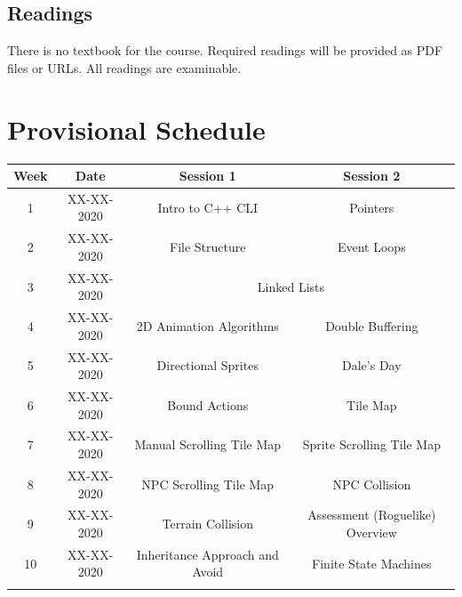 \documentclass{article}
\begin{document}
\subsection*{Readings}
There is no textbook for the course. Required readings will be provided as PDF files or URLs. All readings are examinable.

\section*{Provisional Schedule}

\renewcommand{\arraystretch}{1.5}
\begin{tabular}{|c|c|c|c|}
  \hline
  \textbf{Week} & \textbf{Date} & \textbf{Session 1}             & \textbf{Session 2}                         \\ \hline
  1             & XX-XX-2020    & Intro to C++ CLI               & Pointers                                   \\ \hline
  2             & XX-XX-2020    & File Structure                 & Event Loops                                \\ \hline
  3             & XX-XX-2020    & \multicolumn{2}{c|}{Linked Lists}                                           \\ \hline
  4             & XX-XX-2020    & 2D Animation Algorithms        & Double Buffering                           \\ \hline
  5             & XX-XX-2020    & Directional Sprites            & \cellcolor{yellow} Dale's Day              \\ \hline
  6             & XX-XX-2020    & Bound Actions                  & Tile Map                                   \\ \hline
  7             & XX-XX-2020    & Manual Scrolling Tile Map      & Sprite Scrolling Tile Map                  \\ \hline
  8             & XX-XX-2020    & NPC Scrolling Tile Map         & NPC Collision                              \\ \hline
  9             & XX-XX-2020    & Terrain Collision              & Assessment (Roguelike) Overview            \\ \hline
  10            & XX-XX-2020    & Inheritance Approach and Avoid & Finite State Machines                      \\ \hline
  \rowcolor{yellow} \multicolumn{4}{|c|}{Mid Term Break}                                                      \\ \hline

\end{tabular}
\end{document}
